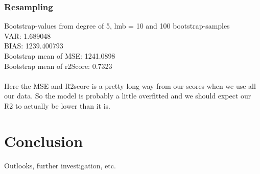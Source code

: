 \documentclass[a4paper,norsk]{article}
\begin{document}
\subsubsection{Resampling}
Bootstrap-values from degree of 5, lmb = 10 and 100 bootstrap-samples
\\VAR: 1.689048
\\BIAS: 1239.400793
\\Bootstrap mean of MSE: 1241.0898
\\Bootstrap mean of r2Score: 0.7323
\\
\\Here the MSE and R2score is a pretty long way from our scores when we use all our data. So the model is probably a little overfitted and we should expect our R2 to actually be lower than it is.
\clearpage
\section{Conclusion}

\par
Outlooks, further investigation, etc.
\end{document}
